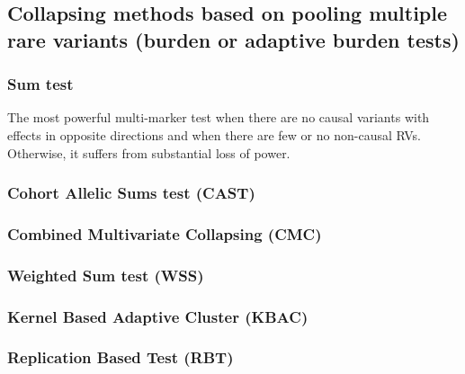 \documentclass[
]{book}
\begin{document}
\hypertarget{collapsing-methods-based-on-pooling-multiple-rare-variants-burden-or-adaptive-burden-tests}{%
\subsection{Collapsing methods based on pooling multiple rare variants (burden or adaptive burden tests)}\label{collapsing-methods-based-on-pooling-multiple-rare-variants-burden-or-adaptive-burden-tests}}

\hypertarget{sum-test}{%
\subsubsection{Sum test}\label{sum-test}}

The most powerful multi-marker test when there are no causal variants with effects in opposite directions and when there are few or no non-causal RVs. Otherwise, it suffers from substantial loss of power.

\hypertarget{cohort-allelic-sums-test-cast}{%
\subsubsection{Cohort Allelic Sums test (CAST)}\label{cohort-allelic-sums-test-cast}}

\hypertarget{combined-multivariate-collapsing-cmc}{%
\subsubsection{Combined Multivariate Collapsing (CMC)}\label{combined-multivariate-collapsing-cmc}}

\hypertarget{weighted-sum-test-wss}{%
\subsubsection{Weighted Sum test (WSS)}\label{weighted-sum-test-wss}}

\hypertarget{kernel-based-adaptive-cluster-kbac}{%
\subsubsection{Kernel Based Adaptive Cluster (KBAC)}\label{kernel-based-adaptive-cluster-kbac}}

\hypertarget{replication-based-test-rbt}{%
\subsubsection{Replication Based Test (RBT)}\label{replication-based-test-rbt}}
\end{document}
